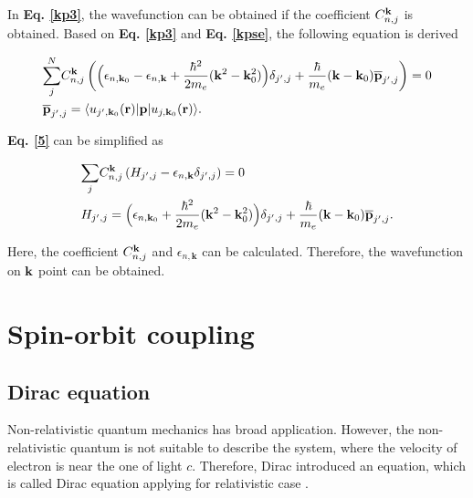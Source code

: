 \documentclass[a4paper, 12pt, titlepage,oneside,drop]{kthesis}
\begin{document}
In \textbf{Eq. \ref{kp3}}, the wavefunction can be obtained if the coefficient $C_{n,j}^{\bold k}$ is obtained. Based on \textbf{Eq. \ref{kp3}} and  \textbf{Eq. \ref{kpse}}, the following equation is derived

\begin{equation}\begin{split}\label{5}
& {\sum\limits_{j}^{N}}  C_{n,j}^{\bold k} \left(  \Big(  \epsilon_{n,\textbf{k}_0} -  \epsilon_{n,\textbf{k}}  + \frac{{\hbar}^2}{2m_e} { (\bold {k}^2- \bold {k}_0^2)}    \Big) \delta_{j',j} + \frac{\hbar}{m_e} {(\bold {k}-\bold{k}_0)} {\overline{\textbf{p}}_{j',j}} \right ) = 0 \\
& {\overline{\textbf{p}}_{j',j}} = \langle \ubloch<j'><\textbf{k}_0>| {\textbf p} | \ubloch<j><\textbf{k}_0>  \rangle.
\end{split}
\end{equation}

\textbf{Eq. \ref{5}} can be simplified as
 
\begin{equation}\begin{split}\label{6}
& {\sum\limits_{j}} C_{n,j}^{\bold {k}} \left ( H_{j',j}-  \epsilon_{n,\textbf{k}} \delta_{j',j} \right ) =0 \\
& H_{j',j} = \Big(   \epsilon_{n,\textbf{k}_0}  + \frac{{\hbar}^2}{2m_e} { (\bold{k}^2-\bold{k}_0^2)}    \Big) \delta_{j',j} + \frac{\hbar}{m_e} {(\bold{k}-\bold{k}_0)} {\overline{\textbf{p}}_{j',j}}.
\end{split}
\end{equation}

Here, the coefficient $ C_{n,j}^{\bold k}$ and $\epsilon_{n,\textbf{k}}$ can be calculated. Therefore, the wavefunction on ${ \textbf k}$ point can be obtained.


\section{Spin-orbit coupling}
\label{srasoc}

\subsection{Dirac equation}

Non-relativistic quantum mechanics has broad application. However, the non-relativistic quantum is not suitable to describe the system, where the velocity of electron is near the one of light $c$. 
Therefore, Dirac introduced an equation, which is called Dirac equation applying for relativistic case \cite{thaller1992dirac, dirac1930principles}.
\end{document}
